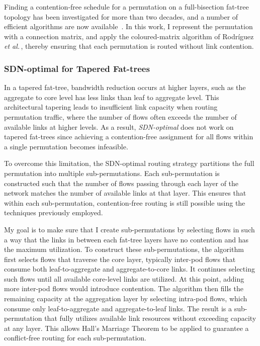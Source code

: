 Finding a contention-free schedule for a permutation on a full-bisection
fat-tree topology has been investigated for more than two decades, and a
number of efficient algorithms are now available\,%
\cite{Paull1962,Rodriguez2009,Zahavi2010,Prisacari2013}.  In this work, I
represent the permutation with a connection
matrix,\cite{Paull1962} and apply the coloured-matrix algorithm of
Rodríguez \emph{et al.}\,\cite{Rodriguez2009}, thereby ensuring that each
permutation is routed without link contention.

\subsubsection{SDN-optimal for Tapered Fat-trees}

In a tapered fat-tree, bandwidth reduction occurs at higher layers,
such as the aggregate to core level has less links than leaf to aggregate
level. This architectural tapering leads to insufficient link capacity
when routing permutation traffic, where the number of flows often
exceeds the number of available links at higher levels.
As a result, \textit{SDN-optimal} does not work on tapered fat-trees
since achieving a contention-free assignment for all flows within a
single permutation becomes infeasible.

To overcome this limitation, the SDN-optimal routing strategy
partitions the full permutation into multiple sub-permutations.
Each sub-permutation is constructed such that the number of flows
passing through each layer of the network matches the number of
available links at that layer. This ensures that within each
sub-permutation, contention-free routing is still possible using
the techniques previously employed.

My goal is to make sure that I create sub-permutations by
selecting flows in such a way that the links in between each
fat-tree layers have no contention and has the maximum utilization. 
To construct these sub-permutations, the algorithm first selects
flows that traverse the core layer, typically inter-pod flows that consume both leaf-to-aggregate and aggregate-to-core links. It continues selecting such flows until all available core-level links are utilized. At this point, adding more inter-pod flows would introduce contention. The algorithm then fills the remaining capacity at the aggregation layer by selecting intra-pod flows, which consume only leaf-to-aggregate and aggregate-to-leaf links. The result is a sub-permutation that fully utilizes available link resources without exceeding capacity at any layer. This allows Hall’s Marriage Theorem \cite{cameron2025hall} \cite{hall1987representatives} to be applied to guarantee a conflict-free routing for each sub-permutation.

